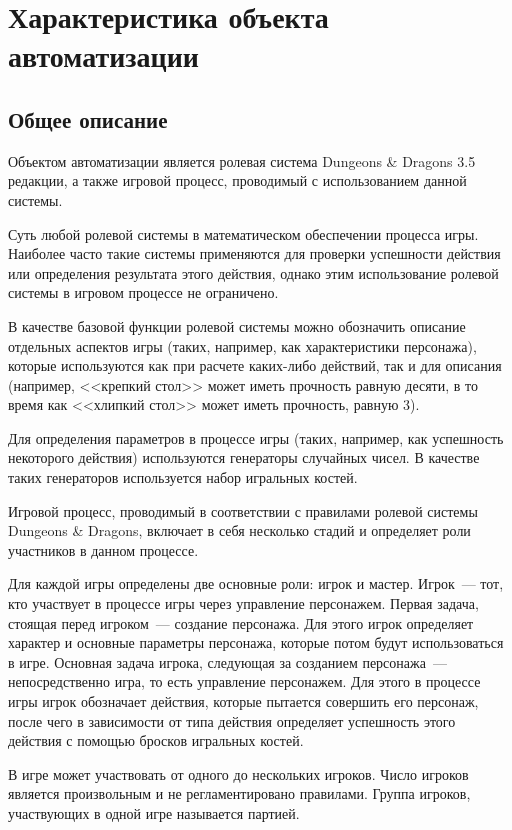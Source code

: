 \section{Характеристика объекта автоматизации}


\subsection{Общее описание}

Объектом автоматизации является ролевая система Dungeons \& Dragons 3.5 редакции, а также игровой процесс, проводимый с использованием данной системы.

Суть любой ролевой системы в математическом обеспечении процесса игры. Наиболее часто такие системы применяются для проверки успешности действия или определения результата этого действия, однако этим использование ролевой системы в игровом процессе не ограничено. 

В качестве базовой функции ролевой системы можно обозначить описание отдельных аспектов игры (таких, например, как характеристики персонажа), которые используются как при расчете каких-либо действий, так и для описания (например, <<крепкий стол>> может иметь прочность равную десяти, в то время как <<хлипкий стол>> может иметь прочность, равную 3).

Для определения параметров в процессе игры (таких, например, как успешность некоторого действия) используются генераторы случайных чисел. В качестве таких генераторов используется набор игральных костей.

Игровой процесс, проводимый в соответствии с правилами ролевой системы Dungeons \& Dragons, включает в себя несколько стадий и определяет роли участников в данном процессе.

Для каждой игры определены две основные роли: игрок и мастер. Игрок~--- тот, кто участвует в процессе игры через управление персонажем. Первая задача, стоящая перед игроком~--- создание персонажа. Для этого игрок определяет характер и основные параметры персонажа, которые потом будут использоваться в игре. Основная задача игрока, следующая за созданием персонажа~--- непосредственно игра, то есть управление персонажем. Для этого в процессе игры игрок обозначает действия, которые пытается совершить его персонаж, после чего в зависимости от типа действия определяет успешность этого действия с помощью бросков игральных костей.

В игре может участвовать от одного до нескольких игроков. Число игроков является произвольным и не регламентировано правилами. Группа игроков, участвующих в одной игре называется партией.

